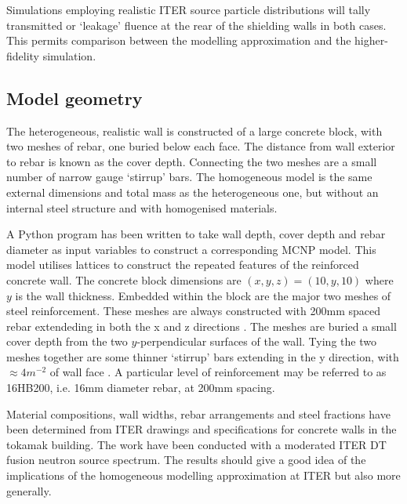 Simulations employing realistic ITER source particle distributions will tally transmitted or `leakage' fluence at the rear of the shielding walls in both cases. This permits comparison between the modelling approximation and the higher-fidelity simulation.

\subsection{Model geometry}
The heterogeneous, realistic wall is constructed of a large concrete block, with two meshes of rebar, one buried below each face. The distance from wall exterior to rebar is known as the cover depth. Connecting the two meshes are a small number of narrow gauge `stirrup' bars. The homogeneous model is the same external dimensions and total mass as the heterogeneous one, but without an internal steel structure and with homogenised materials.

A Python program has been written to take wall depth, cover depth and rebar diameter as input variables to construct a corresponding MCNP model. This model utilises lattices to construct the repeated features of the reinforced concrete wall. The concrete block dimensions are $(x, y, z) = (10, y, 10)$ where $y$ is the wall thickness. Embedded within the block are the major two meshes of steel reinforcement. These meshes are always constructed with 200mm spaced rebar extendeding in both the x and z directions \cite{Perez2014}. The meshes are buried a small cover depth from the two $y$-perpendicular surfaces of the wall. Tying the two meshes together are some thinner `stirrup' bars extending in the y direction, with $\approx 4m^{-2}$ of wall face \cite{Perez2014}. A particular level of reinforcement may be referred to as 16HB200, i.e. 16mm diameter rebar, at 200mm spacing.

Material compositions, wall widths, rebar arrangements and steel fractions have been determined from ITER drawings and specifications for concrete walls in the tokamak building. The work have been conducted with a moderated ITER DT fusion neutron source spectrum. The results should give a good idea of the implications of the homogeneous modelling approximation at ITER but also more generally. 


